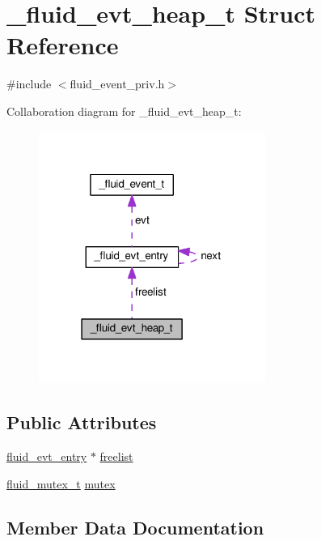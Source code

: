 \hypertarget{struct__fluid__evt__heap__t}{}\section{\+\_\+fluid\+\_\+evt\+\_\+heap\+\_\+t Struct Reference}
\label{struct__fluid__evt__heap__t}


{\ttfamily \#include $<$fluid\+\_\+event\+\_\+priv.\+h$>$}



Collaboration diagram for \+\_\+fluid\+\_\+evt\+\_\+heap\+\_\+t\+:
\nopagebreak
\begin{figure}[H]
\begin{center}
\leavevmode
\includegraphics[width=210pt]{struct__fluid__evt__heap__t__coll__graph}
\end{center}
\end{figure}
\subsection*{Public Attributes}
\begin{DoxyCompactItemize}
\item 
\hyperlink{fluid__event__priv_8h_ae1b4d1ef2ce32890f8cb36837628a9d8}{fluid\+\_\+evt\+\_\+entry} $\ast$ \hyperlink{struct__fluid__evt__heap__t_a417ea7c73b75471d695807154f3b77bb}{freelist}
\item 
\hyperlink{fluid__sys_8h_a7252a44982e8ed2704689f563c8a12e3}{fluid\+\_\+mutex\+\_\+t} \hyperlink{struct__fluid__evt__heap__t_ade738dbaaa24d4002c236d80397ac709}{mutex}
\end{DoxyCompactItemize}


\subsection{Member Data Documentation}
\mbox{\label{struct__fluid__evt__heap__t_a417ea7c73b75471d695807154f3b77bb}} 
